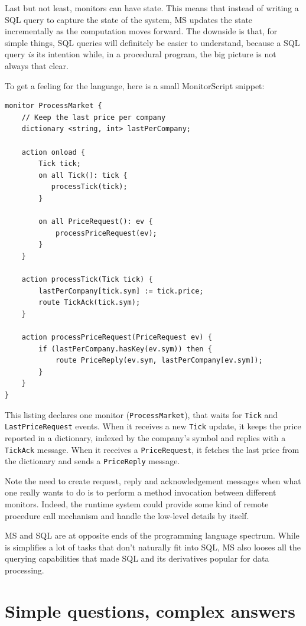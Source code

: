 \documentclass{report}
\begin{document}
Last but not least, monitors can have state. This means that instead
of writing a SQL query to capture the state of the system, MS updates
the state incrementally as the computation moves forward. The downside
is that, for simple things, SQL queries will definitely be easier to
understand, because a SQL query \emph{is} its intention while, in a
procedural program, the big picture is not always that clear.

To get a feeling for the language, here is a small MonitorScript
snippet:

\begin{verbatim}
monitor ProcessMarket {
    // Keep the last price per company
    dictionary <string, int> lastPerCompany;

    action onload {
        Tick tick;
        on all Tick(): tick {
           processTick(tick);
        }

        on all PriceRequest(): ev {
            processPriceRequest(ev);
        }
    }

    action processTick(Tick tick) {
        lastPerCompany[tick.sym] := tick.price;
        route TickAck(tick.sym);
    }

    action processPriceRequest(PriceRequest ev) {
        if (lastPerCompany.hasKey(ev.sym)) then {
            route PriceReply(ev.sym, lastPerCompany[ev.sym]);
        }
    }
}
\end{verbatim}

This listing declares one monitor (\verb=ProcessMarket=), that waits
for \verb=Tick= and \verb=LastPriceRequest= events. When it receives a
new \verb=Tick= update, it keeps the price reported in a dictionary,
indexed by the company's symbol and replies with a \verb=TickAck=
message. When it receives a \verb=PriceRequest=, it fetches the last
price from the dictionary and sends a \verb=PriceReply= message.

Note the need to create request, reply and acknowledgement messages
when what one really wants to do is to perform a method invocation
between different monitors. Indeed, the runtime system could provide
some kind of remote procedure call mechanism and handle the low-level
details by itself.

MS and SQL are at opposite ends of the programming language
spectrum. While is simplifies a lot of tasks that don't naturally fit
into SQL, MS also looses all the querying capabilities that made SQL
and its derivatives popular for data processing.

\chapter{Simple questions, complex answers}
\label{chap:simple-questions-complex-answers}
\end{document}
